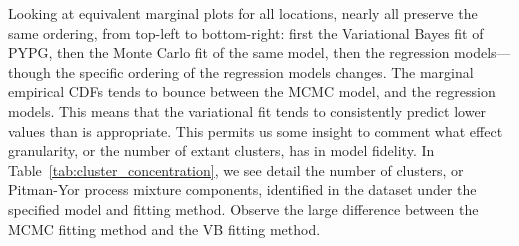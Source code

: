 Looking at equivalent marginal plots for all locations, nearly all preserve the
    same ordering, from top-left to bottom-right: first the Variational Bayes fit of PYPG, then the 
    Monte Carlo fit of the same model, then the regression models---though the specific ordering of
    the regression models changes.  The marginal empirical CDFs tends to bounce\makenote{[rephrase]}
    between the MCMC model, and the regression models.  This means that the variational fit
    tends to consistently predict lower values than is appropriate. This permits us some insight 
    to comment what effect granularity, or the number of extant clusters, has in model fidelity.
    In Table~\ref{tab:cluster_concentration}, we see detail the number of clusters, or Pitman-Yor
    process mixture components, identified in the dataset under the specified model and fitting 
    method.  Observe the large difference between the MCMC fitting method and the VB fitting
    method. 




